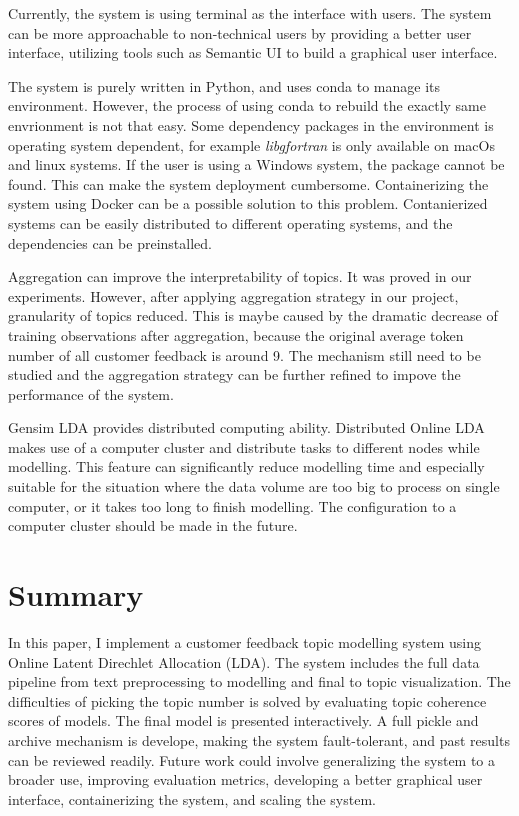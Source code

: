 \documentclass{article} %
\begin{document}
Currently, the system is using terminal as the interface with users. The system can be more approachable to non-technical users by providing a better user interface, utilizing tools such as Semantic UI to build a graphical user interface.

The system is purely written in Python, and uses conda to manage its environment. However, the process of using conda to rebuild the exactly same envrionment is not that easy. Some dependency packages in the environment is operating system dependent, for example \textit{libgfortran} is only available on macOs and linux systems. If the user is using a Windows system, the package cannot be found. This can make the system deployment cumbersome. Containerizing the system using Docker can be a possible solution to this problem. Contanierized systems can be easily distributed to different operating systems, and the dependencies can be preinstalled. 

Aggregation can improve the interpretability of topics. It was proved in our experiments. However, after applying aggregation strategy in our project, granularity of topics reduced. This is maybe caused by the dramatic decrease of training observations after aggregation, because the original average token number of all customer feedback is around 9. The mechanism still need to be studied and the aggregation strategy can be further refined to impove the performance of the system.

Gensim LDA provides distributed computing ability. Distributed Online LDA makes use of a computer cluster and distribute tasks to different nodes while modelling. This feature can significantly reduce modelling time and especially suitable for the situation where the data volume are too big to process on single computer, or it takes too long to finish modelling. The configuration to a computer cluster should be made in the future. 

\section{Summary}
In this paper, I implement a customer feedback topic modelling system using Online Latent Direchlet Allocation (LDA). The system includes the full data pipeline from text preprocessing to modelling and final to topic visualization. The difficulties of picking the topic number is solved by evaluating topic coherence scores of models. The final model is presented interactively. A full pickle and archive mechanism is develope, making the system fault-tolerant, and past results can be reviewed readily. Future work could involve generalizing the system to a broader use, improving evaluation metrics, developing a better graphical user interface, containerizing the system, and scaling the system.
\end{document}
